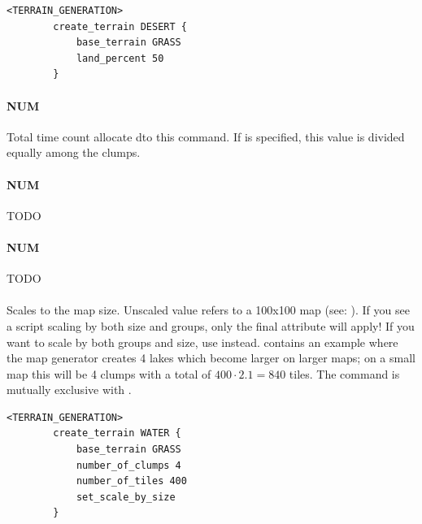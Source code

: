 \begin{appendices}
    \begin{lstlisting}[language={rms},label={lst:createterrain}]
        <TERRAIN_GENERATION>
        create_terrain DESERT {
            base_terrain GRASS
            land_percent 50
        }
    \end{lstlisting}

    \paragraph{ NUM}

    Total time count allocate dto this  command. If  is specified, this value is divided equally among the clumps.

    \paragraph{ NUM}

    TODO

    \paragraph{ NUM}

    TODO

    \paragraph{}

    Scales  to the map size. Unscaled value refers to a 100x100 map (see: ). If you see a script scaling by both size and groups, only the final attribute will apply! If you want to scale by both groups and size, use  instead.  contains an example where the map generator creates 4 lakes which become larger on larger maps; on a small map this will be 4 clumps with a total of $400 \cdot 2.1 = 840$ tiles. The command is mutually exclusive with .

    \begin{lstlisting}[language={rms},label={lst:setscalebysize}]
        <TERRAIN_GENERATION>
        create_terrain WATER {
            base_terrain GRASS
            number_of_clumps 4
            number_of_tiles 400
            set_scale_by_size
        }
    \end{lstlisting}


\end{appendices}
